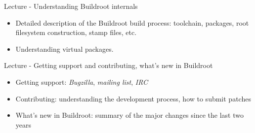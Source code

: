 \documentclass[a4paper,12pt,obeyspaces,spaces,hyphens]{article}
\begin{document}
\feagendatwocolumn
{Lecture - Understanding Buildroot internals}
{
  \begin{itemize}
  \item Detailed description of the Buildroot build process:
    toolchain, packages, root filesystem construction, stamp files,
    etc.
  \item Understanding virtual packages.
  \end{itemize}
}
{Lecture - Getting support and contributing, what's new in Buildroot}
{
  \begin{itemize}
  \item Getting support: {\em Bugzilla}, {\em mailing list}, {\em IRC}
  \item Contributing: understanding the development process, how to
    submit patches
  \item What's new in Buildroot: summary of the major changes since
    the last two years
  \end{itemize}
}
\end{document}
